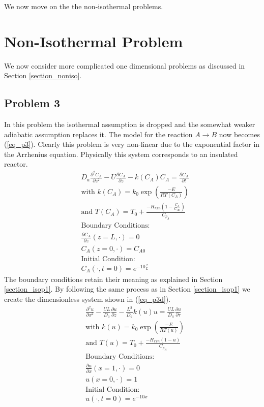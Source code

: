 \documentclass[11pt,fleqn]{article}
\theoremstyle{defstyle}
\begin{document}
We now move on the the non-isothermal problems.

\section{Non-Isothermal Problem}

We now consider more complicated one dimensional problems as discussed in Section \ref{section_noniso}.

\subsection{Problem 3}
In this problem the isothermal assumption is dropped and the somewhat weaker adiabatic assumption replaces it. The model for the reaction $A \rightarrow B$ now becomes (\ref{eq_p3}). Clearly this problem is very non-linear due to the exponential factor in the 
Arrhenius equation. Physically this system corresponds to an insulated reactor.
\begin{equation}
\begin{aligned}
&D_a \frac{\partial^2 C_A}{\partial z^2} - U \frac{\partial C_A}{\partial z} - k(C_A)
C_A = \frac{\partial C_A}{\partial t} \\
& \text{with }k(C_A) = k_0 \exp \left(\frac{-E}{RT(C_A)}\right) \\
& \text{and } T(C_A) = T_0 + \frac{-H_{rxn} \left(1-\frac{C_A}{C_{A0}}\right)}{C_{p_A}} \\
&\text{Boundary Conditions:} \\
&\frac{\partial C_A}{\partial z}(z=L, \cdot) = 0\\
&C_A(z=0, \cdot) = C_{A0} \\
&\text{Initial Condition:} \\
& C_A(\cdot, t= 0) = e^{-10\frac{z}{L}}
\end{aligned}
\label{eq_p3}
\end{equation}
The boundary conditions retain their meaning as explained in Section \ref{section_isop1}. By following the same process as in Section \ref{section_isop1} we create the dimensionless system shown in (\ref{eq_p3d}).
\begin{equation}
\begin{aligned}
&\frac{\partial^2 u}{\partial x^2} - \frac{UL}{D_a}\frac{\partial u}{\partial z} - \frac{L^2}{D_a} k(u)u = \frac{UL}{D_a}\frac{\partial u}{\partial \tau} \\
& \text{with }k(u) = k_0 \exp\left(\frac{-E}{RT(u)}\right) \\
& \text{and } T(u) = T_0 + \frac{-H_{rxn} \left(1-u\right)}{C_{p_A}} \\
&\text{Boundary Conditions:} \\
&\frac{\partial u}{\partial x}(x=1, \cdot) = 0\\
&u(x=0, \cdot) = 1 \\
&\text{Initial Condition:} \\
& u(\cdot, t= 0) = e^{-10x}
\end{aligned}
\label{eq_p3d}
\end{equation}
\end{document}
